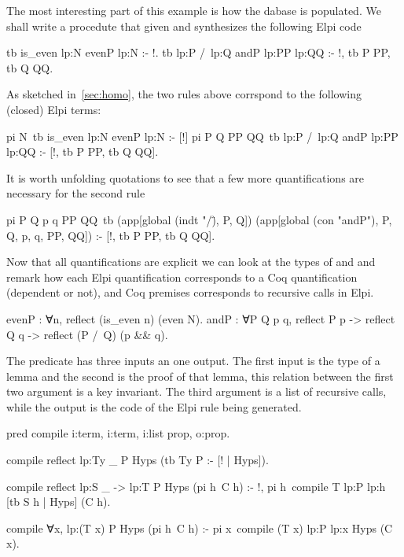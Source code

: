 \documentclass[a4paper, 11pt]{book}
\begin{document}
The most interesting part of this example is how the dabase is populated.
We shall write a  procedute that given 
and  synthesizes the following Elpi code

\begin{elpicode}
tb {{ is_even lp:N }} {{ evenP lp:N }} :- !.
tb {{ lp:P /\ lp:Q }} {{ andP lp:PP lp:QQ }} :- !, tb P PP, tb Q QQ.
\end{elpicode}

As sketched in~\ref{sec:homo}, the two rules above corrspond to the
following (closed) Elpi terms:

\begin{elpicode}
pi N\ tb {{ is_even lp:N }} {{ evenP lp:N }} :- [!]
pi P Q PP QQ\ tb {{ lp:P /\ lp:Q }} {{ andP lp:PP lp:QQ }} :-
  [!, tb P PP, tb Q QQ].
\end{elpicode}

It is worth unfolding quotations to see that a few more quantifications are
necessary for the second rule

\begin{elpicode}
pi P Q p q PP QQ\
  tb (app[global (indt "/\"), P, Q])
     (app[global (con "andP"), P, Q, p, q, PP, QQ]) :-
  [!, tb P PP, tb Q QQ].
\end{elpicode}
  

Now that all quantifications are explicit we can look at the types of
\coqinline{evenP} and \coqinline{andP} and remark how each 
Elpi quantification corresponds to a Coq quantification (dependent or not),
and Coq premises corresponds to recursive calls in Elpi.

\begin{coqcode}
evenP : ∀n, reflect (is_even n) (even N).
andP : ∀P Q p q,
  reflect P p -> reflect Q q -> reflect (P /\ Q) (p && q).
\end{coqcode}

The  predicate has three inputs an one output.
The first input is the type of a lemma and the second is the proof of that
lemma, this relation between the first two argument is a key invariant.
The third argument is a list of recursive calls, while the output is
the code of the Elpi rule being generated.

\begin{elpicode}
pred compile i:term, i:term, i:list prop, o:prop.

compile {{ reflect lp:Ty _ }} P Hyps (tb Ty P :- [! | Hyps]).

compile {{ reflect lp:S _ -> lp:T }} P Hyps (pi h\ C h) :- !,
  pi h\ compile T {{ lp:P lp:h }} [tb S h | Hyps] (C h).

compile {{ ∀x, lp:(T x) }} P Hyps (pi h\ C h) :-
  pi x\ compile (T x) {{ lp:P lp:x }} Hyps (C x).
\end{elpicode}
\end{document}
